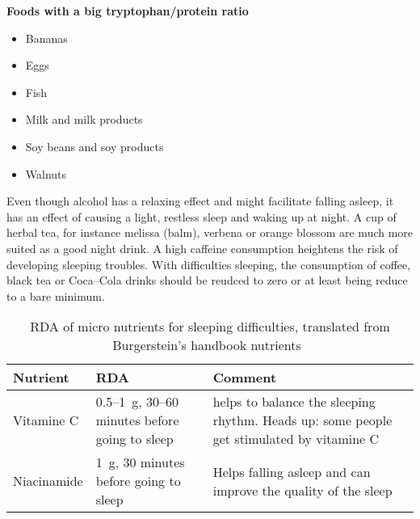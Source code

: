 \documentclass[../main.tex]{subfiles}
\begin{document}
\vspace{5mm}
\noindent
\begin{center}
\begin{fminipage}{0.45\textwidth}
  \textbf{Foods with a big tryptophan/protein ratio}
  \begin{itemize}
  \item Bananas
  \item Eggs
  \item Fish
  \item Milk and milk products
  \item Soy beans and soy products
    \item Walnuts
  \end{itemize}
\end{fminipage}
\end{center}

Even though alcohol has a relaxing effect and might facilitate falling asleep,
it has an effect of causing a light, restless sleep and waking up at night.
A cup of herbal tea, for instance melissa (balm), verbena or orange blossom are much more suited as a good night drink.
A high caffeine consumption heightens the risk of developing sleeping troubles.
With difficulties sleeping, the consumption of coffee, black tea or Coca--Cola drinks should be reudced to zero or at least
being reduce to a bare minimum.


  \begin{table}[htb!]
    \centering
    \begin{tabular}{p{2cm}p{4cm}p{5.5cm}}
      \textbf{Nutrient} &\textbf{RDA} & \textbf{Comment} \\
      \hline
      Vitamine C\index{vitamine!C} & 0.5--\SI{1}{\gram}, 30--60 minutes before going to sleep
                                      & helps to balance the sleeping rhythm. Heads up: some people get stimulated by vitamine C \\
      Niacinamide\index{micro nutrient!niacinamide} & \SI{1}{\gram}, 30 minutes before going to sleep & Helps falling asleep and can improve the quality of the sleep\\
    \end{tabular}
    \caption[RDA of micro nutrients in for sleeping difficulties]
    {RDA of micro nutrients for sleeping difficulties, translated from  Burgerstein's handbook nutrients~\cite{BurgerNutrient}}
  \end{table}
\end{document}
